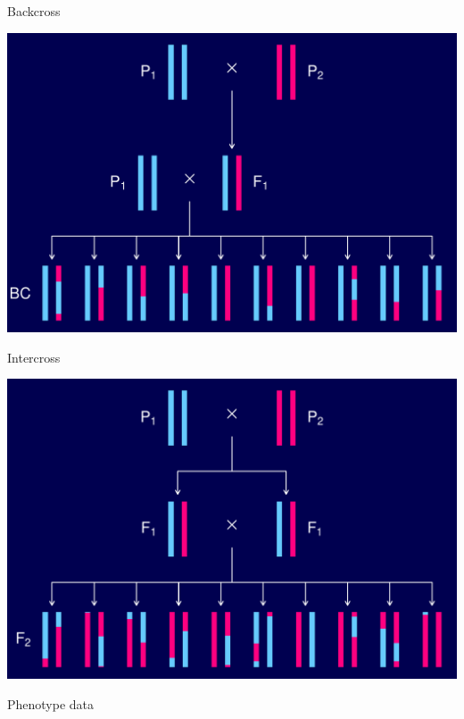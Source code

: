 \documentclass[12pt]{article}
\newcommand{\headsize}{\fontsize{35}{35} \selectfont}
\begin{document}
\newpage

\headsize \color{myyellow}
\hfill \begin{minipage}{5.75in}
\centering
Backcross
\end{minipage}

\vfill

\centerline{\includegraphics{Figs/backcross.pdf}}

\newpage

\headsize \color{myyellow}
\hfill \begin{minipage}{5.75in}
\centering
Intercross
\end{minipage}

\vfill

\centerline{\includegraphics{Figs/intercross.pdf}}

\newpage

\headsize \color{myyellow}
\hfill \begin{minipage}{5.75in}
\centering
Phenotype data
\end{minipage}
\end{document}
